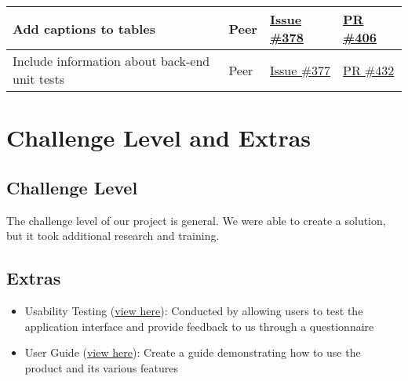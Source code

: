 \documentclass{article}
\begin{document}
\begin{longtable}{|p{5cm}|p{1.5cm}|p{2cm}|p{5cm}|}
Add captions to tables & Peer & \href{https://github.com/OKKM-insights/OKKM.insights/issues/378}{Issue \#378} & \href{https://github.com/OKKM-insights/OKKM.insights/pull/406}{PR \#406} \\ \hline
Include information about back-end unit tests & Peer & \href{https://github.com/OKKM-insights/OKKM.insights/issues/377}{Issue \#377} & \href{https://github.com/OKKM-insights/OKKM.insights/pull/432}{PR \#432} \\ \hline
\end{longtable}
\section{Challenge Level and Extras}

\subsection{Challenge Level}
The challenge level of our project is general. We were able to create a solution, but it took additional research and training.

\subsection{Extras}
\begin{itemize}
  \item Usability Testing (\href{https://github.com/OKKM-insights/OKKM.insights/blob/main/docs/Extras/UsabilityReport/UsabilityReport.pdf}{view here}): Conducted by allowing users to test the application interface and provide feedback to us through a questionnaire
  \item User Guide (\href{https://github.com/OKKM-insights/OKKM.insights/tree/main/docs/UserGuide}{view here}): Create a guide demonstrating how to use the product and its various features
\end{itemize}
\end{document}

